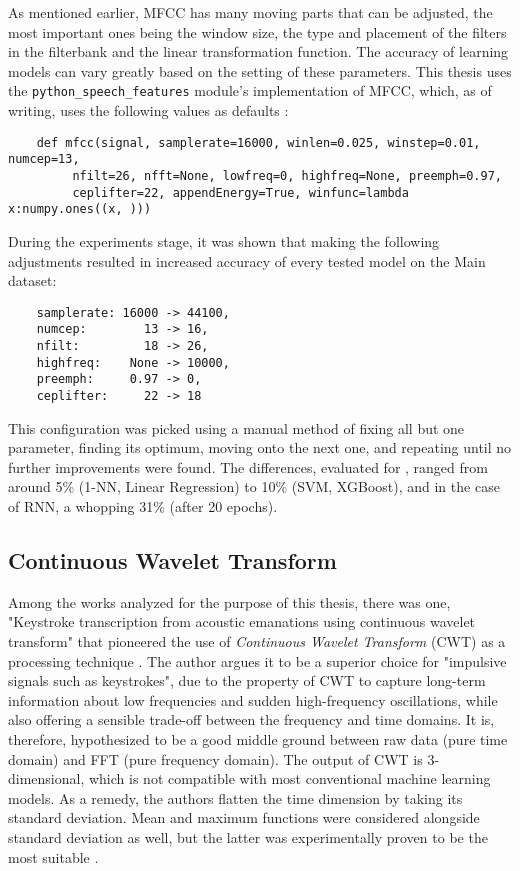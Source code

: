 \documentclass[../main.tex]{subfiles}
\begin{document}
As mentioned earlier, MFCC has many moving parts that can be adjusted, the most important ones being
the window size, the type and placement of the filters in the filterbank and the linear transformation
function. The accuracy of learning models can vary greatly based on the setting of these parameters.
This thesis uses the \verb`python_speech_features` module's implementation of MFCC, which, as of writing,
uses the following values as defaults \cite{pythonspeechfeatures}:
\begin{verbatim}
    def mfcc(signal, samplerate=16000, winlen=0.025, winstep=0.01, numcep=13, 
         nfilt=26, nfft=None, lowfreq=0, highfreq=None, preemph=0.97,
         ceplifter=22, appendEnergy=True, winfunc=lambda x:numpy.ones((x, )))
\end{verbatim}
During the experiments stage, it was shown that making the following adjustments resulted in increased accuracy of every tested model on the Main dataset:
\begin{verbatim}
    samplerate: 16000 -> 44100,
    numcep:        13 -> 16,
    nfilt:         18 -> 26,
    highfreq:    None -> 10000,
    preemph:     0.97 -> 0,
    ceplifter:     22 -> 18
\end{verbatim}
This configuration was picked using a manual method of fixing all but one parameter, finding its optimum, moving onto the next one, and repeating until no further improvements were found.
The differences, evaluated for , ranged from around 5\% (1-NN, Linear Regression) to 10\% (SVM, XGBoost), and in the case of RNN, a whopping 31\% (after 20 epochs).

\subsection{Continuous Wavelet Transform}
\label{sec:dataset_wavelet}
Among the works analyzed for the purpose of this thesis, there was one, "Keystroke transcription from
acoustic emanations using continuous wavelet transform" that pioneered the use of \emph{Continuous Wavelet
Transform} (CWT) as a processing technique \cite{wavelet2022}. The author argues it to be a superior
choice for "impulsive signals such as keystrokes", due to the property of CWT to capture long-term
information about low frequencies and sudden high-frequency oscillations, while also offering a sensible
trade-off between the frequency and time domains. It is, therefore, hypothesized to be a good middle ground between
raw data (pure time domain) and FFT (pure frequency domain). The output of CWT is 3-dimensional, which is
not compatible with most conventional machine learning models. As a remedy, the authors flatten the time
dimension by taking its standard deviation. Mean and maximum functions were considered alongside standard
deviation as well, but the latter was experimentally proven to be the most suitable \cite{wavelet2022}.
\end{document}
